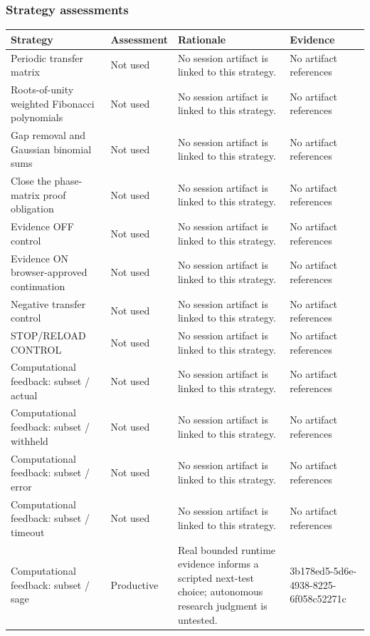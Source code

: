 \documentclass[11pt]{article}
\begin{document}
\subsubsection*{Strategy assessments}
\begin{longtable}{>{\raggedright\arraybackslash}p{.16\linewidth}>{\raggedright\arraybackslash}p{.15\linewidth}>{\raggedright\arraybackslash}p{.40\linewidth}>{\raggedright\arraybackslash}p{.17\linewidth}}
\toprule Strategy & Assessment & Rationale & Evidence \\
\midrule\endhead
Periodic transfer matrix & Not used & No session artifact is linked to this strategy. & No artifact references \\
Roots-of-unity weighted Fibonacci polynomials & Not used & No session artifact is linked to this strategy. & No artifact references \\
Gap removal and Gaussian binomial sums & Not used & No session artifact is linked to this strategy. & No artifact references \\
Close the phase-matrix proof obligation & Not used & No session artifact is linked to this strategy. & No artifact references \\
Evidence OFF control & Not used & No session artifact is linked to this strategy. & No artifact references \\
Evidence ON browser-approved continuation & Not used & No session artifact is linked to this strategy. & No artifact references \\
Negative transfer control & Not used & No session artifact is linked to this strategy. & No artifact references \\
STOP/RELOAD CONTROL & Not used & No session artifact is linked to this strategy. & No artifact references \\
Computational feedback: subset / actual & Not used & No session artifact is linked to this strategy. & No artifact references \\
Computational feedback: subset / withheld & Not used & No session artifact is linked to this strategy. & No artifact references \\
Computational feedback: subset / error & Not used & No session artifact is linked to this strategy. & No artifact references \\
Computational feedback: subset / timeout & Not used & No session artifact is linked to this strategy. & No artifact references \\
Computational feedback: subset / sage & Productive & Real bounded runtime evidence informs a scripted next-test choice; autonomous research judgment is untested. & 3b178ed5-5d6e-4938-8225-6f058c52271c \\
\bottomrule
\end{longtable}
\end{document}

